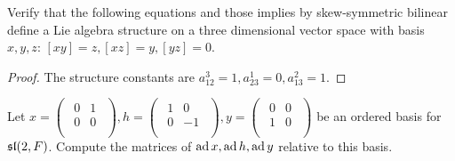 \begin{ex}\label{ex1.2}
  Verify that the following equations and those implies by skew-symmetric bilinear define a Lie algebra structure on a three dimensional vector space with basis $x, y, z$: $[x y] = z, [x z] = y, [y z] = 0.$
\end{ex}
\begin{proof}
  The structure constants are $a_{12}^3=1, a_{23}^1=0, a_{13}^2=1$.
\end{proof}

\begin{ex}
  Let $x=\begin{pmatrix}
           \begin{smallmatrix}
           0 & 1\\
           0 & 0 \\
           \end{smallmatrix}
         \end{pmatrix}
  , h=\begin{pmatrix}
           \begin{smallmatrix}
           1 & 0\\
           0 & -1 \\
           \end{smallmatrix}
         \end{pmatrix}
  , y=\begin{pmatrix}
           \begin{smallmatrix}
           0 & 0\\
           1 & 0 \\
           \end{smallmatrix}
         \end{pmatrix}$
  be an ordered basis for $\sl(2,F)$. Compute the matrices of $\ad x, \ad h, \ad y$ relative to this basis.
\end{ex}

